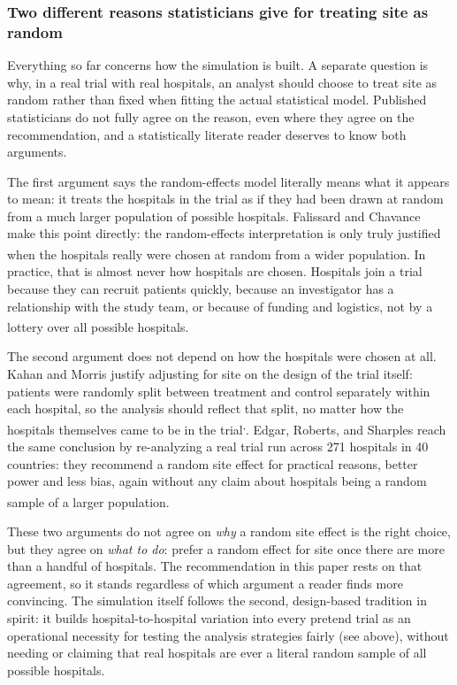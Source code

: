 \documentclass[
  11pt,
]{article}
\begin{document}
\subsubsection{Two different reasons statisticians give for treating site as random}\label{two-different-reasons-statisticians-give-for-treating-site-as-random}

Everything so far concerns how the simulation is built. A
separate question is why, in a real trial with real
hospitals, an analyst should choose to treat site as random
rather than fixed when fitting the actual statistical model.
Published statisticians do not fully agree on the reason,
even where they agree on the recommendation, and a
statistically literate reader deserves to know both
arguments.

The first argument says the random-effects model literally
means what it appears to mean: it treats the hospitals in
the trial as if they had been drawn at random from a much
larger population of possible hospitals. Falissard and
Chavance make this point directly: the random-effects
interpretation is only truly justified when the hospitals
really were chosen at random from a wider population\textsuperscript{}. In practice, that is almost never how
hospitals are chosen. Hospitals join a trial because they can
recruit patients quickly, because an investigator has a
relationship with the study team, or because of funding and
logistics, not by a lottery over all possible hospitals\textsuperscript{}.

The second argument does not depend on how the hospitals were
chosen at all. Kahan and Morris justify adjusting for site on
the design of the trial itself: patients were randomly split
between treatment and control separately within each
hospital, so the analysis should reflect that split, no
matter how the hospitals themselves came to be in the trial\textsuperscript{,}.
Edgar, Roberts, and Sharples reach the same conclusion by
re-analyzing a real trial run across 271 hospitals in 40
countries: they recommend a random site effect for practical
reasons, better power and less bias, again without any claim
about hospitals being a random sample of a larger population\textsuperscript{}.

These two arguments do not agree on \emph{why} a random site
effect is the right choice, but they agree on \emph{what to do}:
prefer a random effect for site once there are more than a
handful of hospitals. The recommendation in this paper rests
on that agreement, so it stands regardless of which argument
a reader finds more convincing. The simulation itself follows
the second, design-based tradition in spirit: it builds
hospital-to-hospital variation into every pretend trial as an
operational necessity for testing the analysis strategies
fairly (see above), without needing or claiming that real
hospitals are ever a literal random sample of all possible
hospitals.
\end{document}
